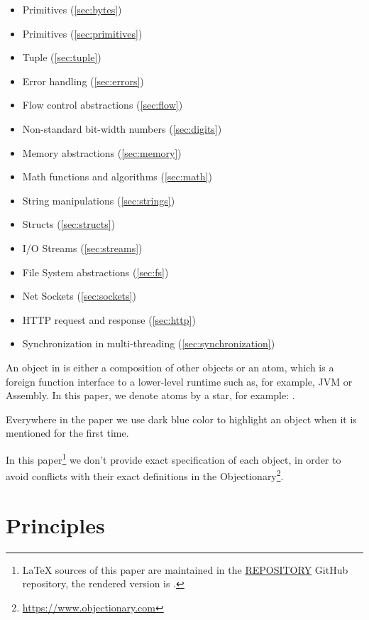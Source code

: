 \documentclass[sigplan,nonacm]{acmart}
\newcommand\aff[1]{\ff{\textcolor{gray}{$\star$}#1}}
\begin{document}
\begin{itemize}
    \item Primitives (\cref{sec:bytes})
    \item Primitives (\cref{sec:primitives})
    \item Tuple (\cref{sec:tuple})
    \item Error handling (\cref{sec:errors})
    \item Flow control abstractions (\cref{sec:flow})
    \item Non-standard bit-width numbers (\cref{sec:digits})
    \item Memory abstractions (\cref{sec:memory})
    \item Math functions and algorithms (\cref{sec:math})
    \item String manipulations (\cref{sec:strings})
    \item Structs (\cref{sec:structs})
    \item I/O Streams (\cref{sec:streams})
    \item File System abstractions (\cref{sec:fs})
    \item Net Sockets (\cref{sec:sockets})
    \item HTTP request and response (\cref{sec:http})
    \item Synchronization in multi-threading (\cref{sec:synchronization})
\end{itemize}

An object in \eolang{} is either a composition of other objects or an atom, which is a
foreign function interface to a lower-level runtime such as, for example, JVM
or Assembly. In this paper, we denote atoms by a star, for example:
\aff{times}.

Everywhere in the paper we use dark blue color to highlight an object when it is
mentioned for the first time.

In this paper\footnote{%
\LaTeX{} sources of this paper are maintained in the
\href{https://github.com/REPOSITORY}{REPOSITORY} GitHub repository,
the rendered version is \href{https://github.com/REPOSITORY/releases/tag/0.0.0}{}.}
we don't provide exact specification of each object, in order to avoid
conflicts with their exact definitions in the
Objectionary\footnote{\url{https://www.objectionary.com}}.

\section{Principles}
\end{document}
